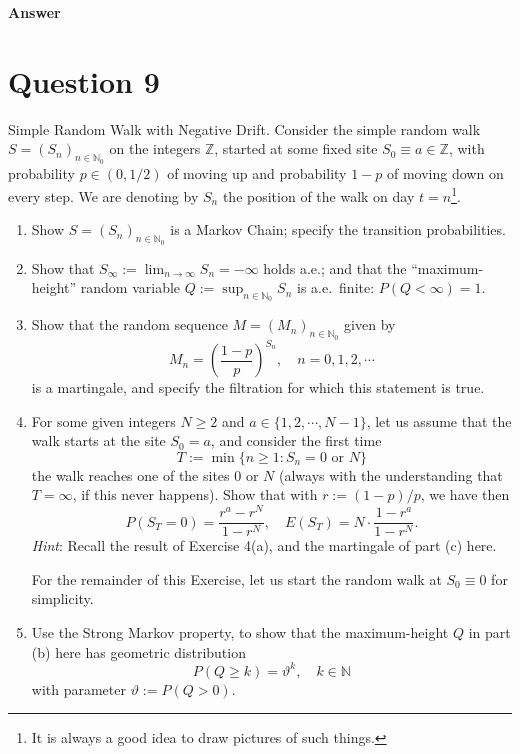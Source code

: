 \documentclass[letterpaper]{article}
\begin{document}
\textbf{Answer}
		\clearpage
		
		\section{Question 9}
		
			{\color{deepred} Simple Random Walk with Negative Drift.} Consider the simple random walk $S = (S_n)_{n \in \mathbb{N}_0}$ on the integers $\mathbb{Z}$, started at some fixed site $S_0 \equiv a \in \mathbb{Z}$, with probability $p \in (0, 1/2)$ of moving up and probability $1-p$ of moving down on every step. We are denoting by $S_n$ the position of the walk on day $t = n$\footnote{ It is always a good idea to draw pictures of such things.}.
			
			\begin{enumerate}
				\item[(a)] Show $S = (S_n)_{n \in \mathbb{N}_0}$ is a Markov Chain; specify the transition probabilities.
				
				\item[(b)] Show that $S_\infty := \lim_{n \to \infty} S_n = -\infty$ holds a.e.; and that the ``maximum-height'' random variable $Q := \sup_{n \in \mathbb{N}_0} S_n$ is a.e.\ finite: $P(Q < \infty) = 1$.
				
				\item[(c)] Show that the random sequence $M = (M_n)_{n \in \mathbb{N}_0}$ given by
				\[
				M_n = \left(\frac{1-p}{p}\right)^{S_n}, \quad n = 0, 1, 2, \cdots \tag{0.1}
				\]
				is a martingale, and specify the filtration for which this statement is true.
				
				\item[(d)] For some given integers $N \geq 2$ and $a \in \{1, 2, \cdots, N-1\}$, let us assume that the walk starts at the site $S_0 = a$, and consider the first time
				\[
				T := \min\{n \geq 1 : S_n = 0 \text{ or } N\} \tag{0.2}
				\]
				the walk reaches one of the sites $0$ or $N$ (always with the understanding that $T = \infty$, if this never happens). Show that with $r := (1-p)/p$, we have then
				\[
				P(S_T = 0) = \frac{r^a - r^N}{1 - r^N}, \quad E(S_T) = N \cdot \frac{1 - r^a}{1 - r^N}.
				\]
			\textit{Hint}: Recall the result of Exercise 4(a), and the martingale of part (c) here.
			
			For the remainder of this Exercise, let us start the random walk at $S_0 \equiv 0$ for simplicity.
			
			\item[(e)] Use the Strong Markov property, to show that the maximum-height $Q$ in part (b) here has geometric distribution
			\[
			P(Q \geq k) = \vartheta^k, \quad k \in \mathbb{N} \tag{0.3}
			\]
			with parameter $\vartheta := P(Q > 0)$.
			

\end{enumerate}
\end{document}
